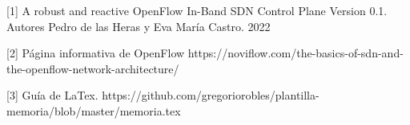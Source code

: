 \documentclass[a4paper, 12pt]{book}
\begin{document}
	\cleardoublepage
	
	
	\cleardoublepage
	
	
	 
	
	[1]  A robust and reactive
	OpenFlow In-Band SDN Control Plane
	Version 0.1. Autores Pedro de las Heras y Eva María Castro. 2022
	
	[2]  Página informativa de OpenFlow https://noviflow.com/the-basics-of-sdn-and-the-openflow-network-architecture/ 
		
	[3]  Guía de LaTex.  https://github.com/gregoriorobles/plantilla-memoria/blob/master/memoria.tex
	
	
 	
	
\end{document}
